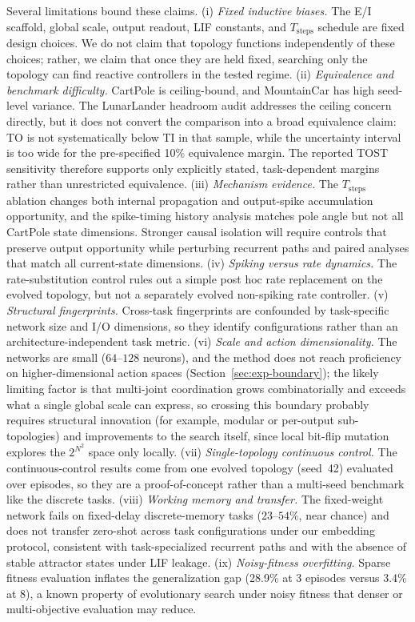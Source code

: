 \documentclass[10pt]{article}
\begin{document}
Several limitations bound these claims. (i) \emph{Fixed inductive biases.} The
E/I scaffold, global scale, output readout, LIF constants, and
$T_\text{steps}$ schedule are fixed design choices. We do not claim that topology
functions independently of these choices; rather, we claim that once they are
held fixed, searching only the topology can find reactive controllers in the
tested regime. (ii) \emph{Equivalence and benchmark difficulty.} CartPole is
ceiling-bound, and MountainCar has high seed-level variance. The LunarLander
headroom audit addresses the ceiling concern directly, but it does not convert
the comparison into a broad equivalence claim: TO is not systematically below TI
in that sample, while the uncertainty interval is too wide for the
pre-specified 10\% equivalence margin. The reported TOST sensitivity therefore
supports only explicitly stated, task-dependent margins rather than unrestricted
equivalence.
(iii) \emph{Mechanism evidence.} The $T_\text{steps}$ ablation changes both
internal propagation and output-spike accumulation opportunity, and the
spike-timing history analysis matches pole angle but not all CartPole state
dimensions. Stronger causal isolation will require controls that preserve output
opportunity while perturbing recurrent paths and paired analyses that match all
current-state dimensions. (iv) \emph{Spiking versus rate dynamics.} The rate-substitution control rules
out a simple post hoc rate replacement on the evolved topology, but not a
separately evolved non-spiking rate controller. (v) \emph{Structural
fingerprints.} Cross-task fingerprints are confounded by task-specific network
size and I/O dimensions, so they identify configurations rather than an
architecture-independent task metric. (vi) \emph{Scale and action dimensionality.}
The networks are small
($64$--$128$ neurons), and the method does not reach proficiency on
higher-dimensional action spaces (Section~\ref{sec:exp-boundary}); the likely
limiting factor is that multi-joint coordination grows combinatorially and
exceeds what a single global scale can express, so crossing this boundary
probably requires structural innovation (for example, modular or per-output
sub-topologies) and improvements to the search itself, since local bit-flip
mutation explores the $2^{N^2}$ space only locally. (vii)
\emph{Single-topology continuous control.} The continuous-control results come
from one evolved topology (seed~42) evaluated over episodes, so they are a
proof-of-concept rather than a multi-seed benchmark like the discrete tasks. (viii)
\emph{Working memory and transfer.} The fixed-weight network fails on fixed-delay
discrete-memory tasks ($23$--$54\%$, near chance) and does not transfer zero-shot
across task configurations under our embedding protocol, consistent with
task-specialized recurrent paths and with the absence of stable attractor states
under LIF leakage. (ix) \emph{Noisy-fitness overfitting.} Sparse fitness evaluation
inflates the generalization gap (28.9\% at 3 episodes versus 3.4\% at 8), a known
property of evolutionary search under noisy fitness
\citep{rechenberg1973,fogel1995} that denser or multi-objective evaluation may
reduce.
\end{document}
